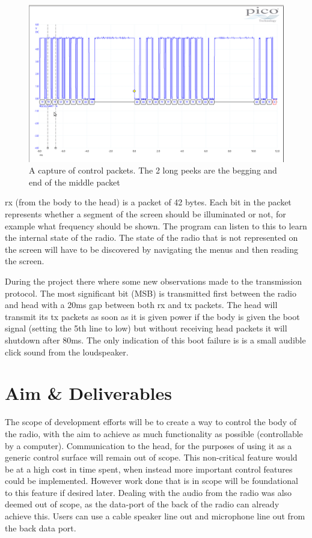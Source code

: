 \begin{figure}
    \centering
    \includegraphics[width=1\textwidth]{img/controll_packet.png}
    \caption[Control packet]{A capture of control packets. The 2 long peeks are the begging and end of the middle packet}
    \label{fig:control_packet}
\end{figure}

\gls{rx} (from the body to the head) is a packet of 42 bytes. Each bit in the packet represents whether a segment of the screen should be illuminated or not, for example what frequency should be shown. The program can listen to this to learn the internal state of the radio. The state of the radio that is not represented on the screen will have to be discovered by navigating the menus and then reading the screen.

During the project there where some new observations made to the transmission protocol. The most significant bit (MSB) is transmitted first between the radio and head with a 20ms gap between both \gls{rx} and \gls{tx} packets. The head will transmit its \gls{tx} packets as soon as it is given power if the body is given the boot signal (setting the 5th line to low) but without receiving head packets it will shutdown after 80ms. The only indication of this boot failure is is a small audible click sound from the loudspeaker. 

\section{Aim \& Deliverables}
The scope of development efforts will be to create a way to control the body of the radio, with the aim to achieve as much functionality as possible (controllable by a computer). Communication to the head, for the purposes of using it as a generic control surface will remain out of scope. This non-critical feature would be at a high cost in time spent, when instead more important control features could be implemented. However work done that is in scope will be foundational to this feature if desired later. Dealing with the audio from the radio was also deemed out of scope, as the data-port of the back of the radio can already achieve this. Users can use a cable speaker line out and microphone line out from the back data port.

